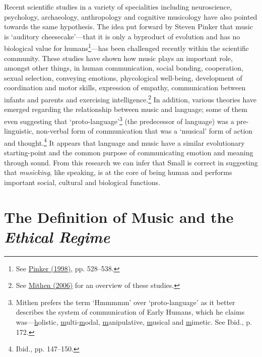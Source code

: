 Recent scientific studies in a variety of specialities including neuroscience, psychology, archaeology, anthropology and cognitive musicology have also pointed towards the same hypothesis. The idea put forward by Steven Pinker that music is `auditory cheesecake'---that it is only a byproduct of evolution and has no biological value for humans\footnote{See \hyperlink{pinker}{Pinker (1998)}, pp. 528--538.}---has been challenged recently within the scientific community.  These studies have shown how music plays an important role, amongst other things, in human communication, social bonding, cooperation, sexual selection, conveying emotions, phycological \mbox{well-being}, development of coordination and motor skills, expression of empathy, communication between infants and parents and exercising intelligence.\footnote{See \hyperlink{mithen}{Mithen (2006)} for an overview of these studies.} In addition, various theories have emerged regarding the relationship between music and language; some of them even suggesting that \mbox{`proto-language'}\footnote{Mithen prefers the term `Hmmmmm' over `proto-language' as it better describes the system of communication of Early Humans, which he claims was---\underline{h}olistic, \underline{m}ulti-\underline{m}odal, \underline{m}anipulative, \underline{m}usical and \underline{m}imetic. See Ibid., p. 172.} (the predecessor of language) was a pre-linguistic, non-verbal form of communication that was a `musical' form of action and thought.\footnote{Ibid., pp. 147--150.} It appears that language and music have a similar evolutionary \mbox{starting-point} and the common purpose of communicating emotion and meaning through sound. From this research we can infer that Small is correct in suggesting that \emph{musicking}, like speaking, is at the core of being human and performs important social, cultural and biological functions. 

\hypertarget{musdef}{}
\section{The Definition of Music and the \emph{Ethical Regime}}

